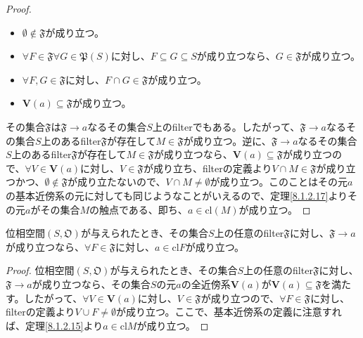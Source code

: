 \documentclass[dvipdfmx]{jsarticle}
\begin{document}
\begin{proof}
\begin{itemize}
\item
  $\emptyset \notin \mathfrak{F}$が成り立つ。
\item
  $\forall F \in \mathfrak{F}\forall G \in \mathfrak{P}(S)$に対し、$F \subseteq G \subseteq S$が成り立つなら、$G \in \mathfrak{F}$が成り立つ。
\item
  $\forall F,G \in \mathfrak{F}$に対し、$F \cap G \in \mathfrak{F}$が成り立つ。
\item
  $\mathbf{V}(a)\subseteq \mathfrak{F}$が成り立つ。
\end{itemize}
その集合$\mathfrak{F}$は$\mathfrak{F} \rightarrow a$なるその集合$S$上のfilterでもある。したがって、$\mathfrak{F} \rightarrow a$なるその集合$S$上のあるfilter$\mathfrak{F}$が存在して$M \in \mathfrak{F}$が成り立つ。逆に、$\mathfrak{F} \rightarrow a$なるその集合$S$上のあるfilter$\mathfrak{F}$が存在して$M \in \mathfrak{F}$が成り立つなら、$\mathbf{V}(a)\subseteq \mathfrak{F}$が成り立つので、$\forall V \in \mathbf{V}(a)$に対し、$V \in \mathfrak{F}$が成り立ち、filterの定義より$V \cap M \in \mathfrak{F}$が成り立つかつ、$\emptyset \notin \mathfrak{F}$が成り立たないので、$V \cap M \neq \emptyset$が成り立つ。このことはその元$a$の基本近傍系の元に対しても同じようなことがいえるので、定理\ref{8.1.2.17}よりその元$a$がその集合$M$の触点である、即ち、$a \in {\mathrm{cl}}(M)$が成り立つ。
\end{proof}
\begin{thm}\label{8.1.8.4}
位相空間$\left( S,\mathfrak{O} \right)$が与えられたとき、その集合$S$上の任意のfilter$\mathfrak{F}$に対し、$\mathfrak{F} \rightarrow a$が成り立つなら、$\forall F \in \mathfrak{F}$に対し、$a \in {\mathrm{cl}}F$が成り立つ。
\end{thm}
\begin{proof}
位相空間$\left( S,\mathfrak{O} \right)$が与えられたとき、その集合$S$上の任意のfilter$\mathfrak{F}$に対し、$\mathfrak{F} \rightarrow a$が成り立つなら、その集合$S$の元$a$の全近傍系$\mathbf{V}(a)$が$\mathbf{V}(a)\subseteq \mathfrak{F}$を満たす。したがって、$\forall V \in \mathbf{V}(a)$に対し、$V \in \mathfrak{F}$が成り立つので、$\forall F \in \mathfrak{F}$に対し、filterの定義より$V \cup F \neq \emptyset$が成り立つ。ここで、基本近傍系の定義に注意すれば、定理\ref{8.1.2.15}より$a \in {\mathrm{cl}}M$が成り立つ。
\end{proof}
\end{document}
